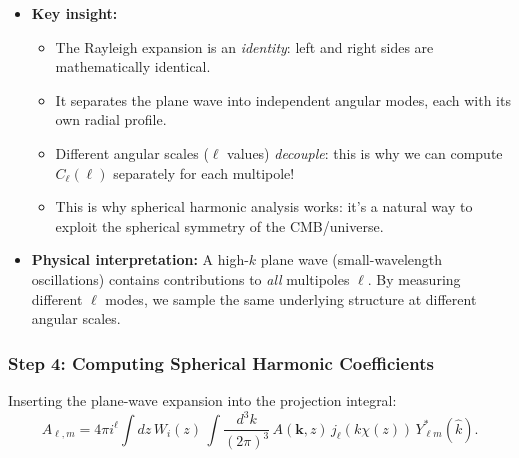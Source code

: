 \begin{itemize}[leftmargin=1.5cm]
    \item \textbf{Key insight:} 
        \begin{itemize}
            \item The Rayleigh expansion is an \emph{identity}: left and right sides are mathematically identical.
            \item It separates the plane wave into independent angular modes, each with its own radial profile.
            \item Different angular scales ($\ell$ values) \emph{decouple}: this is why we can compute $C_\ell(\ell)$ separately for each multipole!
            \item This is why spherical harmonic analysis works: it's a natural way to exploit the spherical symmetry of the CMB/universe.
        \end{itemize}
    
    \item \textbf{Physical interpretation:} A high-$k$ plane wave (small-wavelength oscillations) contains contributions to \emph{all} multipoles $\ell$. By measuring different $\ell$ modes, we sample the same underlying structure at different angular scales.
\end{itemize}

\subsubsection{Step 4: Computing Spherical Harmonic Coefficients}

Inserting the plane-wave expansion into the projection integral:
\begin{equation}
    A_{\ell,m} = 4\pi i^\ell \int dz\, W_i(z)\,
    \int \frac{d^3k}{(2\pi)^3}\, A(\mathbf{k},z)\,
    j_\ell(k\chi(z))\, Y^*_{\ell m}(\hat{k}).
    \label{eq:A_lm}
\end{equation}


